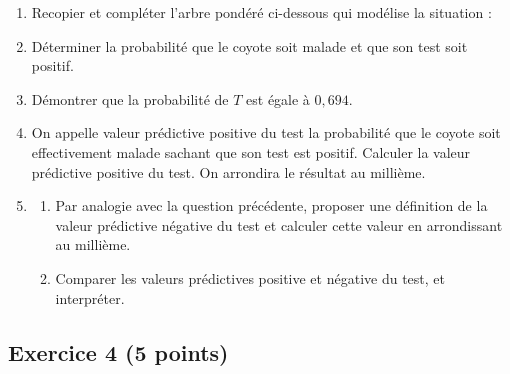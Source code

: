 \documentclass[11pt,a4paper]{article}
\begin{document}
\begin{enumerate}
    \item Recopier et compléter l'arbre pondéré ci-dessous qui modélise la situation :
    \begin{center}
    \end{center}
    \item Déterminer la probabilité que le coyote soit malade et que son test soit positif.
    \item Démontrer que la probabilité de $T$ est égale à $0{,}694$.
    \item On appelle \og valeur prédictive positive du test \fg{} la probabilité que le coyote soit effectivement malade sachant que son test est positif. Calculer la valeur prédictive positive du test. On arrondira le résultat au millième.
    \item 
    \begin{enumerate}
        \item Par analogie avec la question précédente, proposer une définition de la \og valeur prédictive négative du test \fg{} et calculer cette valeur en arrondissant au millième.
        \item Comparer les valeurs prédictives positive et négative du test, et interpréter.
    \end{enumerate}
\end{enumerate}

\vspace{0.3cm}

\subsection*{Exercice 4 \hfill (5 points)}
\end{document}
